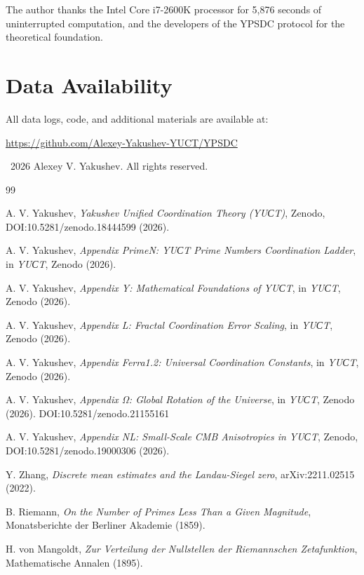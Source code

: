 \documentclass[12pt,a4paper]{article}
\begin{document}
	The author thanks the Intel Core i7-2600K processor for 5,876 seconds of uninterrupted computation, and the developers of the YPSDC protocol for the theoretical foundation.
	
	\section*{Data Availability}
	
	All data logs, code, and additional materials are available at:
	\begin{center}
		\url{https://github.com/Alexey-Yakushev-YUCT/YPSDC}
	\end{center}
	
	\textcopyright\ 2026 Alexey V. Yakushev. All rights reserved.
	
	\begin{thebibliography}{99}
		
		A. V. Yakushev, \emph{Yakushev Unified Coordination Theory (YUСT)}, Zenodo, DOI:10.5281/zenodo.18444599 (2026).
		
		A. V. Yakushev, \emph{Appendix PrimeN: YUСT Prime Numbers Coordination Ladder}, in \emph{YUСT}, Zenodo (2026).
		
		A. V. Yakushev, \emph{Appendix Y: Mathematical Foundations of YUСT}, in \emph{YUСT}, Zenodo (2026).
		
		A. V. Yakushev, \emph{Appendix L: Fractal Coordination Error Scaling}, in \emph{YUСT}, Zenodo (2026).
		
		A. V. Yakushev, \emph{Appendix Ferra1.2: Universal Coordination Constants}, in \emph{YUСT}, Zenodo (2026).
		
		A. V. Yakushev, \emph{Appendix Ω: Global Rotation of the Universe}, in \emph{YUСT}, Zenodo (2026). DOI:10.5281/zenodo.21155161
		
		A. V. Yakushev, \emph{Appendix NL: Small-Scale CMB Anisotropies in YUСT}, Zenodo, DOI:10.5281/zenodo.19000306 (2026).
		
		Y. Zhang, \emph{Discrete mean estimates and the Landau-Siegel zero}, arXiv:2211.02515 (2022).
		
		B. Riemann, \emph{On the Number of Primes Less Than a Given Magnitude}, Monatsberichte der Berliner Akademie (1859).
		
		H. von Mangoldt, \emph{Zur Verteilung der Nullstellen der Riemannschen Zetafunktion}, Mathematische Annalen (1895).
		

\end{thebibliography}
\end{document}
